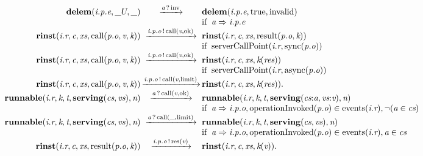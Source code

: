 \[\begin{array}{r@{}c@{}llllll}
\\\Prule{\Tstep{\Tdelem{\Tep{\Tvar{E}}{\Tvar{P}}{\Tvar{I}}}{\_U}{\_}}{\Thear{\Tvar{A}}{\Tinv}}{\Tdelem{\Tep{\Tvar{E}}{\Tvar{P}}{\Tvar{I}}}{\Ttrue}{\Tinvalid}}}{\Tconnect{\Tvar{A}}{\Tep{\Tvar{E}}{\Tvar{P}}{\Tvar{I}}}}
\\\Prule{\Tstep{\Trinst{\Tr{\Tvar{R}}{\Tvar{I}}}{\Tvar{C}}{\Tvar{Xs}}{\TrteCall{\To{\Tvar{O}}{\Tvar{P}}}{\Tvar{V}}{\Tvar{K}}}}{\Tsay{\Top{\Tvar{O}}{\Tvar{P}}{\Tvar{I}}}{\Tcall{\Tvar{V}}{\Tok}}}{\Trinst{\Tr{\Tvar{R}}{\Tvar{I}}}{\Tvar{C}}{\Tvar{Xs}}{\TrteResult{\To{\Tvar{O}}{\Tvar{P}}}{\Tvar{K}}}}}{\TserverCallPoint{\Tr{\Tvar{R}}{\Tvar{I}}}{\Tsync{\To{\Tvar{O}}{\Tvar{P}}}}}
\\\Prule{\Tstep{\Trinst{\Tr{\Tvar{R}}{\Tvar{I}}}{\Tvar{C}}{\Tvar{Xs}}{\TrteCall{\To{\Tvar{O}}{\Tvar{P}}}{\Tvar{V}}{\Tvar{K}}}}{\Tsay{\Top{\Tvar{O}}{\Tvar{P}}{\Tvar{I}}}{\Tcall{\Tvar{V}}{\Tok}}}{\Trinst{\Tr{\Tvar{R}}{\Tvar{I}}}{\Tvar{C}}{\Tvar{Xs}}{\Tap{\Tvar{K}}{\Tvar{Res}}}}}{\TserverCallPoint{\Tr{\Tvar{R}}{\Tvar{I}}}{\Tasync{\To{\Tvar{O}}{\Tvar{P}}}}}
\\\Pfact{\Tstep{\Trinst{\Tr{\Tvar{R}}{\Tvar{I}}}{\Tvar{C}}{\Tvar{Xs}}{\TrteCall{\To{\Tvar{O}}{\Tvar{P}}}{\Tvar{V}}{\Tvar{K}}}}{\Tsay{\Top{\Tvar{O}}{\Tvar{P}}{\Tvar{I}}}{\Tcall{\Tvar{V}}{\Tlimit}}}{\Trinst{\Tr{\Tvar{R}}{\Tvar{I}}}{\Tvar{C}}{\Tvar{Xs}}{\Tap{\Tvar{K}}{\Tvar{Res}}}}}
\\\Prule{\Tstep{\Trunnable{\Tr{\Tvar{R}}{\Tvar{I}}}{\Tvar{K}}{\Tvar{T}}{\Tserving{\Tvar{Cs}}{\Tvar{Vs}}}{\Tvar{N}}}{\Thear{\Tvar{A}}{\Tcall{\Tvar{V}}{\Tok}}}{\Trunnable{\Tr{\Tvar{R}}{\Tvar{I}}}{\Tvar{K}}{\Tvar{T}}{\Tserving{\Tseq{\Tvar{Cs}}{\Tvar{A}}}{\Tseq{\Tvar{Vs}}{\Tvar{V}}}}{\Tvar{N}}}}{\Tconnect{\Tvar{A}}{\Top{\Tvar{O}}{\Tvar{P}}{\Tvar{I}}},\Tmember{\ToperationInvoked{\To{\Tvar{O}}{\Tvar{P}}}}{\Tevents{\Tr{\Tvar{R}}{\Tvar{I}}}},\Pnegate{\Tmember{\Tvar{A}}{\Tvar{Cs}}}}
\\\Prule{\Tstep{\Trunnable{\Tr{\Tvar{R}}{\Tvar{I}}}{\Tvar{K}}{\Tvar{T}}{\Tserving{\Tvar{Cs}}{\Tvar{Vs}}}{\Tvar{N}}}{\Thear{\Tvar{A}}{\Tcall{\_}{\Tlimit}}}{\Trunnable{\Tr{\Tvar{R}}{\Tvar{I}}}{\Tvar{K}}{\Tvar{T}}{\Tserving{\Tvar{Cs}}{\Tvar{Vs}}}{\Tvar{N}}}}{\Tconnect{\Tvar{A}}{\Top{\Tvar{O}}{\Tvar{P}}{\Tvar{I}}},\Tmember{\ToperationInvoked{\To{\Tvar{O}}{\Tvar{P}}}}{\Tevents{\Tr{\Tvar{R}}{\Tvar{I}}}},\Tmember{\Tvar{A}}{\Tvar{Cs}}}
\\\Pfact{\Tstep{\Trinst{\Tr{\Tvar{R}}{\Tvar{I}}}{\Tvar{C}}{\Tvar{Xs}}{\TrteResult{\To{\Tvar{O}}{\Tvar{P}}}{\Tvar{K}}}}{\Tsay{\Top{\Tvar{O}}{\Tvar{P}}{\Tvar{I}}}{\Tres{\Tvar{V}}}}{\Trinst{\Tr{\Tvar{R}}{\Tvar{I}}}{\Tvar{C}}{\Tvar{Xs}}{\Tap{\Tvar{K}}{\Tvar{V}}}}}

\end{array}\]
